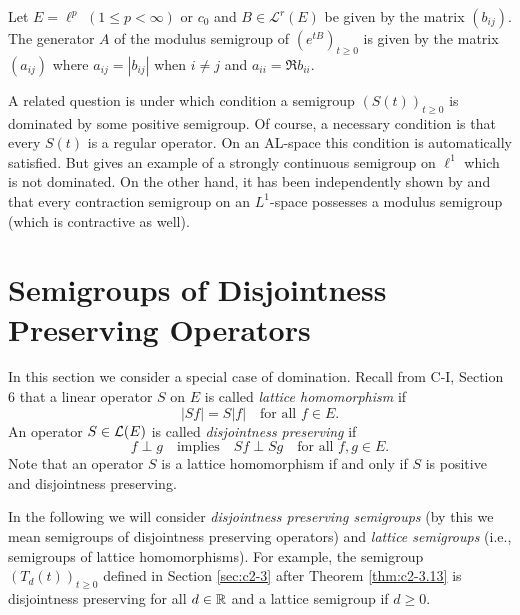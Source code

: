 \begin{example}\label{ex:c2-4.19}
Let $E = \ell^{p}$ $(1 \leq p < \infty)$ or $c_{0}$ and $B \in \mathcal{L}^{r}(E)$ be
given by the matrix $(b_{ij})$.
The generator $A$ of the modulus semigroup of $(e^{tB})_{t \geq 0}$ is given by the matrix $(a_{ij})$ where $a_{ij} = |b_{ij}|$ when $i \neq j$ and $a_{ii} = \Re  b_{ii}$.
\end{example}

A related question is under which condition a semigroup $(S(t))_{t \geq 0}$ is
dominated by some positive semigroup.
Of course, a necessary condition is that every $S(t)$ is a regular operator.
On an AL-space this condition is automatically satisfied.
But \citet{kipnis:1974} gives an example of a strongly continuous semigroup on $\ell^{1}$ which is not dominated.
On the other hand, it has been independently shown by \citet{kipnis:1974} and
\citet{kubokawa:1975} that every contraction semigroup on an $L^{1}$-space
possesses a modulus semigroup (which is contractive as well).
\section{Semigroups of Disjointness Preserving Operators} \label{sec:c2-5}

In this section we consider a special case of domination. 
Recall from C-I, Section 6 
that a linear operator $S$ on $E$ is called \emph{lattice homomorphism} if
\begin{equation}\label{eq:c2-5.1}
|Sf| = S|f| \quad \text{for all } f \in E.
\end{equation}
An operator $S \in \mathcal{L}(E)$ is called \emph{disjointness preserving} if
\begin{equation}\label{eq:c2-5.2}
f \perp g \quad \text{implies} \quad Sf \perp Sg \quad \text{for all } f,g \in E.
\end{equation}
Note that an operator $S$ is a lattice homomorphism if and only if $S$
is positive and disjointness preserving.

In the following we will consider \emph{disjointness preserving semigroups}
(by this we mean semigroups of disjointness preserving operators) and
\emph{lattice semigroups} (i.e., semigroups of lattice homomorphisms). For
example, the semigroup $(T_{d}(t))_{t \geq 0}$ defined in Section \ref{sec:c2-3} after Theorem \ref{thm:c2-3.13}  is disjointness preserving for all $d \in \mathbb{R}$ and a lattice semigroup if $d \geq 0$.


